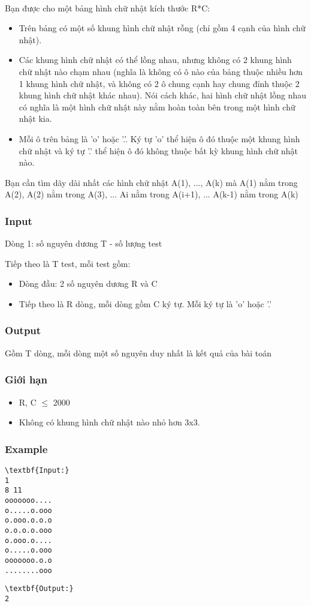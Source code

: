 

 

Bạn được cho một bảng hình chữ nhật kích thước R*C:
\begin{itemize}
	\item Trên bảng có một số khung hình chữ nhật rỗng (chỉ gồm 4 cạnh của hình chữ nhật).
	\item Các khung hình chữ nhật có thể lồng nhau, nhưng không có 2 khung hình chữ nhật nào chạm nhau (nghĩa là không có ô nào của bảng thuộc nhiều hơn 1 khung hình chữ nhật, và không có 2 ô chung cạnh hay chung đỉnh thuộc 2 khung hình chữ nhật khác nhau). Nói cách khác, hai hình chữ nhật lồng nhau có nghĩa là một hình chữ nhật này nằm hoàn toàn bên trong một hình chữ nhật kia.
	\item Mỗi ô trên bảng là 'o' hoặc '.'. Ký tự 'o' thể hiện ô đó thuộc một khung hình chữ nhật và ký tự '.' thể hiện ô đó không thuộc bất kỳ khung hình chữ nhật nào.
\end{itemize}

Bạn cần tìm dãy dài nhất các hình chữ nhật A(1), ..., A(k) mà A(1) nằm trong A(2), A(2) nằm trong A(3), ... Ai nằm trong A(i+1), ... A(k-1) nằm trong A(k)

\subsubsection{Input}

Dòng 1: số nguyên dương T - số lượng test

Tiếp theo là T test, mỗi test gồm:
\begin{itemize}
	\item Dòng đầu: 2 số nguyên dương R và C
	\item Tiếp theo là R dòng, mỗi dòng gồm C ký tự. Mỗi ký tự là 'o' hoặc '.'
\end{itemize}

\subsubsection{Output}

Gồm T dòng, mỗi dòng một số nguyên duy nhất là kết quả của bài toán

\subsubsection{Giới hạn}
\begin{itemize}
	\item R, C  $\le$  2000
	\item Không có khung hình chữ nhật nào nhỏ hơn 3x3.
\end{itemize}

\subsubsection{Example}
\begin{verbatim}
\textbf{Input:}
1
8 11
ooooooo....
o.....o.ooo
o.ooo.o.o.o
o.o.o.o.ooo
o.ooo.o....
o.....o.ooo
ooooooo.o.o
........ooo\end{verbatim}
\begin{verbatim}
\textbf{Output:}
2\end{verbatim}
